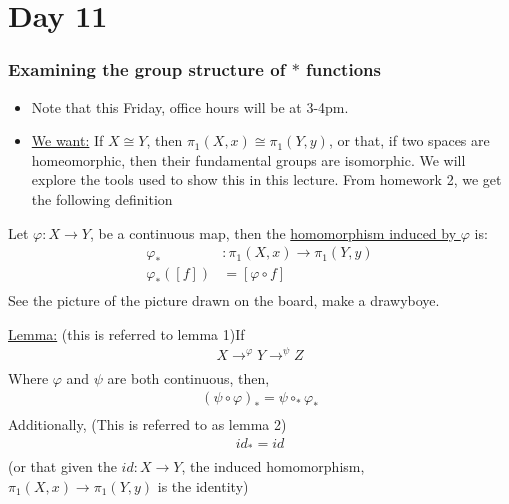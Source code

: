 \documentclass[../notes.tex]{subfiles}
\begin{document}
\section{Day 11}
    \subsubsection{Examining the group structure of $*$ functions}
    \begin{itemize}
        \item Note that this Friday, office hours will be at 3-4pm.
        \item \underline{We want:} If $X\cong Y$, then $\pi_1(X,x)\cong \pi_1(Y,y)$,
            or that, if two spaces are homeomorphic, then their fundamental groups are isomorphic. We
            will explore the tools used to show this in this lecture. From homework 2, we get the following
            definition
    \end{itemize}
    \begin{definition}
        Let $\varphi: X\rightarrow Y$, be a continuous
        map, then the \underline{homomorphism induced by $\varphi$} is:
        \begin{align*}
            \varphi_{*}&: \pi_1(X,x)\rightarrow \pi_1(Y,y)\\
            \varphi_{*}([f])&=[\varphi\circ f]\\
        \end{align*}
        See the picture of the picture drawn on the board, make a drawyboye.
    \item \underline{Lemma:} (this is referred to lemma 1)If
        \begin{align*}
            X\rightarrow^{\varphi}Y\rightarrow^{\psi}Z\\
        \end{align*}
        Where $\varphi$ and $\psi$ are both continuous, then,
        \begin{align*}
            (\psi \circ \varphi)_{*}=\psi \circ_{*} \varphi_{*}\\
        \end{align*}
        Additionally, (This is referred to as lemma 2)
        \begin{align*}
            {id}_{*}=id\\
        \end{align*}
        (or that given the $id: X\rightarrow Y$, the induced homomorphism,
        $\pi_{1}(X,x)\rightarrow \pi_{1}(Y,y)$ is the identity)
    \end{definition}
\end{document}
